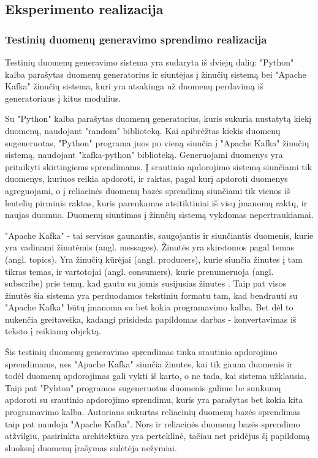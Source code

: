 \documentclass{VUMIFPSkursinis}
\begin{document}
\subsection{Eksperimento realizacija}


\subsubsection{Testinių duomenų generavimo sprendimo realizacija}

Testinių duomenų generavimo sistema yra sudaryta iš dviejų dalių: "Python" kalba parašytas duomenų generatorius ir siuntėjas į žinučių sistemą bei
"Apache Kafka" žinučių sistema, kuri yra atsakinga už duomenų perdavimą iš generatoriaus į kitus modulius.\par
Su "Python" kalba parašytas duomenų generatorius, kuris sukuria nustatytą kiekį duomenų, naudojant "random" biblioteką. Kai apibrėžtas kiekis duomenų sugeneruotas,
"Python" programa juos po vieną siunčia į "Apache Kafka" žinučių sistemą, naudojant "kafka-python" biblioteką. Generuojami duomenys yra pritaikyti skirtingiems sprendimams.
Į srautinio apdorojimo sistemą siunčiami tik duomenys, kuriuos reikia apdoroti, ir raktas, pagal kurį apdoroti duomenys agreguojami, o į reliacinės duomenų
bazės sprendimą siunčiami tik vienos iš lentelių pirminis raktas, kuris parenkamas atsitiktiniai iš visų įmanomų raktų, ir naujas duomuo. Duomenų siuntimas į 
žinučių sistemą vykdomas nepertraukiamai.  \par

"Apache Kafka" - tai servisas gaunantis, saugojantis ir siunčiantis duomenis, kurie yra vadinami žinutėmis (angl. messages). Žinutės yra skirstomos pagal temas (angl. topics).
Yra žinučių kūrėjai (angl. producers), kurie siunčia žinutes į tam tikras temas, ir vartotojai (angl. consumers), kurie prenumeruoja (angl. subscribe)
prie temų, kad gautu su jomis susijusias žinutes \cite{thein2014apache}.  Taip pat visos žinutės šia sistema yra perduodamos tekstiniu formatu 
tam, kad bendrauti su "Apache Kafka" būtų įmanoma su bet kokia programavimo kalba. Bet dėl to nukenčia greitaveika, kadangi prisideda
papildomas darbas - konvertavimas iš teksto į reikiamą objektą.\par
Šis testinių duomenų generavimo sprendimas tinka srautinio apdorojimo sprendimams, nes "Apache Kafka" siunčia žinutes,
kai tik gauna duomenis ir todėl duomenų apdorojimas gali vykti iš karto, o ne tada, kai sistema užklausia. Taip pat "Pyhton" programos sugeneruotus duomenis galime
be sunkumų apdoroti su srautinio apdorojimo sprendimu, kuris yra parašytas bet kokia kita programavimo kalba. 
Autoriaus sukurtas reliacinių duomenų bazės sprendimas taip pat naudoja "Apache Kafka". Nors ir reliacinės duomenų bazės sprendimo atžvilgiu, pasirinkta architektūra yra perteklinė, 
tačiau net pridėjus šį papildomą sluoksnį duomenų įrašymas sulėtėja nežymiai.\par
\newpage
\end{document}
